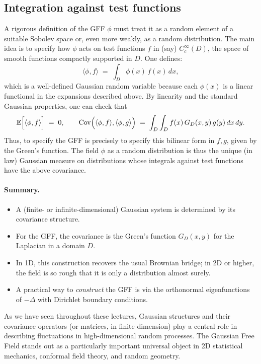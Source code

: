 \documentclass[letterpaper,11pt,oneside,reqno]{article}
\numberwithin{equation}{section}
\theoremstyle{definition}
\begin{document}
\subsection{Integration against test functions}
\label{subsec:gff_test_functions}

A rigorous definition of the GFF $\phi$ must treat it as a random element of a suitable Sobolev space or, even more weakly, as a random distribution. The main idea is to specify how $\phi$ acts on test functions $f$ in (say) $C_c^\infty(D)$, the space of smooth functions compactly supported in $D$. One defines:
\[
   \langle \phi, f\rangle
   \;=\;
   \int_{D} \phi(x)\, f(x)\, dx,
\]
which is a well-defined Gaussian random variable because each $\phi(x)$ is a linear functional in the expansions described above. By linearity and the standard Gaussian properties, one can check that
\[
   \mathbb{E}\Bigl[\langle \phi, f\rangle\Bigr] \;=\; 0,
   \qquad
   \mathrm{Cov}\Bigl(\langle \phi, f\rangle, \langle \phi, g\rangle\Bigr)
   \;=\;
   \int_{D}\int_{D} f(x)\, G_D(x,y)\, g(y)\, dx\, dy.
\]
Thus, to specify the GFF is precisely to specify this bilinear form in $f,g$, given by the Green’s function. The field $\phi$ as a random distribution is thus the unique (in law) Gaussian measure on distributions whose integrals against test functions have the above covariance.

\paragraph{Summary.}
\begin{itemize}
  \item A (finite- or infinite-dimensional) Gaussian system is determined by its covariance structure.
  \item For the GFF, the covariance is the Green’s function $G_D(x,y)$ for the Laplacian in a domain $D$.
  \item In 1D, this construction recovers the usual Brownian bridge; in 2D or higher, the field is so rough that it is only a distribution almost surely.
  \item A practical way to \emph{construct} the GFF is via the orthonormal eigenfunctions of $-\Delta$ with Dirichlet boundary conditions.
\end{itemize}

As we have seen throughout these lectures, Gaussian structures and their covariance operators (or matrices, in finite dimension) play a central role in describing fluctuations in high-dimensional random processes. The Gaussian Free Field stands out as a particularly important universal object in 2D statistical mechanics, conformal field theory, and random geometry.
\end{document}
